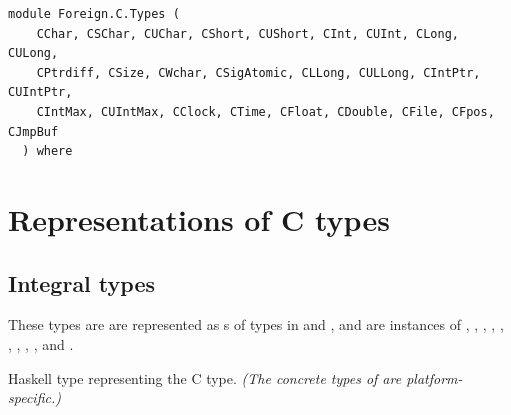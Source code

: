 \label{module:Foreign.C.Types}
\haddockbeginheader
{\haddockverb\begin{verbatim}
module Foreign.C.Types (
    CChar, CSChar, CUChar, CShort, CUShort, CInt, CUInt, CLong, CULong,
    CPtrdiff, CSize, CWchar, CSigAtomic, CLLong, CULLong, CIntPtr, CUIntPtr,
    CIntMax, CUIntMax, CClock, CTime, CFloat, CDouble, CFile, CFpos, CJmpBuf
  ) where\end{verbatim}}
\haddockendheader

\section{Representations of C types}
\subsection{Integral types}
These types are are represented as s of types in 
 and , and are instances of , , , , ,
 , , , ,  and .\par
\begin{haddockdesc}
\item[\begin{tabular}{@{}l}
data CChar
\end{tabular}]
{\haddockbegindoc
Haskell type representing the C  type.
 \emph{(The concrete types of  are platform-specific.)}\par}
\end{haddockdesc}
\begin{haddockdesc}
\item[\begin{tabular}{@{}l}
instance Bits CChar\\instance Bounded CChar\\instance Enum CChar\\instance Storable CChar\\instance Ix CChar\\instance Num CChar\\instance Read CChar\\instance Integral CChar\\instance Real CChar\\instance Show CChar\\instance Eq CChar\\instance Ord CChar
\end{tabular}]
\end{haddockdesc}
